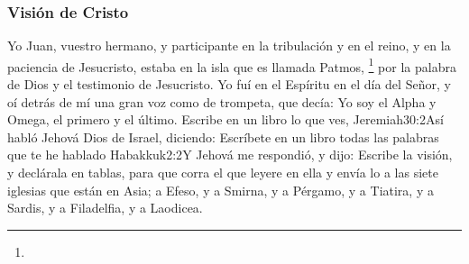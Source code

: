 \subsubsection*{Visión de Cristo}

Yo Juan, vuestro hermano, y participante en la tribulación y en el reino, y en la paciencia de Jesucristo, estaba en la isla que es llamada Patmos,%
	\footnote{ %
			}%
por la palabra de Dios y el testimonio de Jesucristo. %
Yo fuí en el Espíritu en el día del Señor, y oí detrás de mí una gran voz como de trompeta, %
que decía: Yo soy el Alpha y Omega, el primero y el último. Escribe en un libro lo que ves,%
%
				{Jeremiah}{30:2}{Así habló Jehová Dios de Israel, diciendo: Escríbete en un libro todas las palabras que te he hablado}%
				{Habakkuk}{2:2}{Y Jehová me respondió, y dijo: Escribe la visión, y declárala en tablas, para que corra el que leyere en ella} %
 y envía lo a las siete iglesias que están en Asia; a Efeso, y a Smirna, y a Pérgamo, y a Tiatira, y a Sardis, y a Filadelfia, y a Laodicea.

